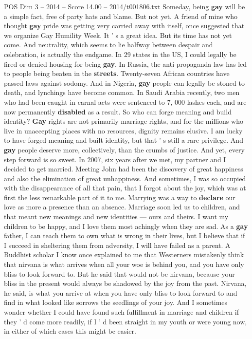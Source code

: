 \begin{textsample}{POS Dim 3 – 2014 – Score 14.00 – 2014/t001806.txt}
Someday, being \textbf{gay} will be a simple fact, free of party hats and blame.
But not yet.
A friend of mine who thought \textbf{gay} pride was getting very carried away with itself, once suggested that we organize Gay Humility Week.
It ' s a great idea.
But its time has not yet come.
And neutrality, which seems to lie halfway between despair and celebration, is actually the endgame.
In 29 states in the US, I could legally be fired or denied housing for being \textbf{gay}.
In Russia, the anti-propaganda law has led to people being beaten in the \textbf{streets}.
Twenty-seven African countries have passed laws against sodomy.
And in Nigeria, \textbf{gay} people can legally be stoned to death, and lynchings have become common.
In Saudi Arabia recently, two men who had been caught in carnal acts were sentenced to 7, 000 lashes each, and are now permanently \textbf{disabled} as a result.
So who can forge meaning and build identity? \textbf{Gay} rights are not primarily marriage rights, and for the millions who live in unaccepting places with no resources, dignity remains elusive.
I am lucky to have forged meaning and built identity, but that ' s still a rare privilege.
And \textbf{gay} people deserve more, collectively, than the crumbs of justice.
And yet, every step forward is so sweet.
In 2007, six years after we met, my partner and I decided to get married.
Meeting John had been the discovery of great happiness and also the elimination of great unhappiness.
And sometimes, I was so occupied with the disappearance of all that pain, that I forgot about the joy, which was at first the less remarkable part of it to me.
Marrying was a way to \textbf{declare} our love as more a presence than an absence.
Marriage soon led us to children, and that meant new meanings and new identities — ours and theirs.
I want my children to be happy, and I love them most achingly when they are sad.
As a \textbf{gay} father, I can teach them to own what is wrong in their lives, but I believe that if I succeed in sheltering them from adversity, I will have failed as a parent.
A Buddhist scholar I know once explained to me that Westerners mistakenly think that nirvana is what arrives when all your woe is behind you, and you have only bliss to look forward to.
But he said that would not be nirvana, because your bliss in the present would always be shadowed by the joy from the past.
Nirvana, he said, is what you arrive at when you have only bliss to look forward to and find in what looked like sorrows the seedlings of your joy.
And I sometimes wonder whether I could have found such fulfillment in marriage and children if they ' d come more readily, if I ' d been straight in my youth or were young now, in either of which cases this might be easier.

\end{textsample}
